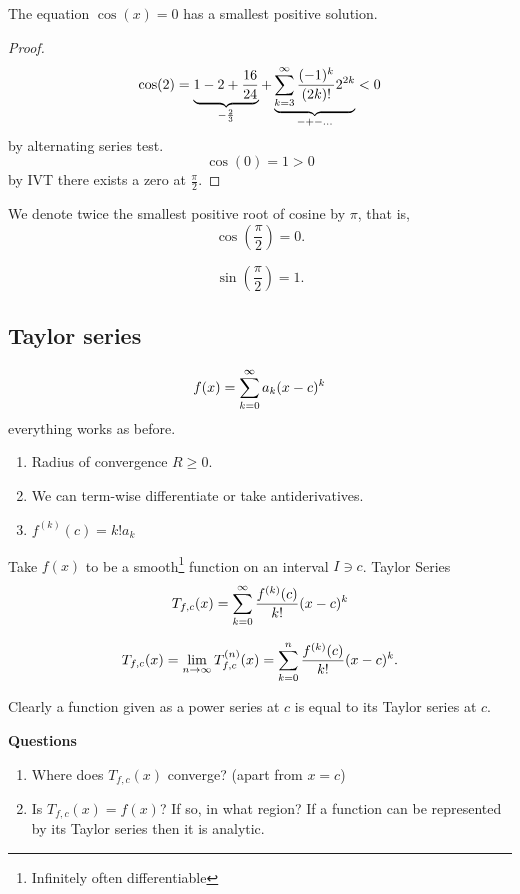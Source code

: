 \documentclass[10pt, a4paper]{article}
\begin{document}
\begin{theorem}
    The equation $\cos(x) = 0$ has a smallest positive solution.

    \begin{proof}
        \[
        \cos(2) = \underbrace{1 - 2 + \frac{16}{24}}_{-\frac{2}{3}} + \underbrace{\infsum[k = 3]\frac{(-1) ^ k}{(2k)!}2 ^ {2k}}_{-+-\dotsc} < 0
        \]
        by alternating series test.
        \[
        \cos(0) = 1 > 0
        \]
        by IVT there exists a zero at $\frac{\pi}{2}$.
    \end{proof}
\end{theorem}

\begin{definition}
    We denote twice the smallest positive root of cosine by $\pi$,
    that is,
    \[
    \cos\left(\frac{\pi}{2}\right) = 0.
    \]
\end{definition}

\begin{theorem}
    \[
    \sin\left(\frac{\pi}{2}\right) = 1.
    \]
\end{theorem}

\subsection{Taylor series}
\[
f(x) = \infsumo a_k(x - c) ^ k
\]
everything works as before.
\begin{remark}
    \begin{enumerate}[label = (\roman*)]
        \item Radius of convergence $R \geq 0$.

        \item We can term-wise differentiate or take antiderivatives.

        \item $f ^ {(k)}(c) = k!a_k$
    \end{enumerate}
\end{remark}

Take $f(x)$ to be a smooth\footnote{Infinitely often differentiable} function on an interval $I \ni c$.
Taylor Series
\[
T_{f, c}(x) = \infsumo\frac{f ^ {(k)}(c)}{k!}(x - c) ^ k
\]

\[
T_{f, c}(x) = \liminfty T_{f, c}^{(n)}(x) = \sum_{k = 0}^{n}\frac{f ^ {(k)}(c)}{k!}(x - c) ^ k.
\]

Clearly a function given as a power series at $c$ is equal to its Taylor series at $c$.

\textbf{Questions}
\begin{enumerate}[label = (\roman*)]
    \item Where does $T_{f, c}(x)$ converge?
    (apart from $x = c$)

    \item Is $T_{f, c}(x) = f(x)$?
    If so,
    in what region?
    If a function can be represented by its Taylor series then it is analytic.
\end{enumerate}
\end{document}
